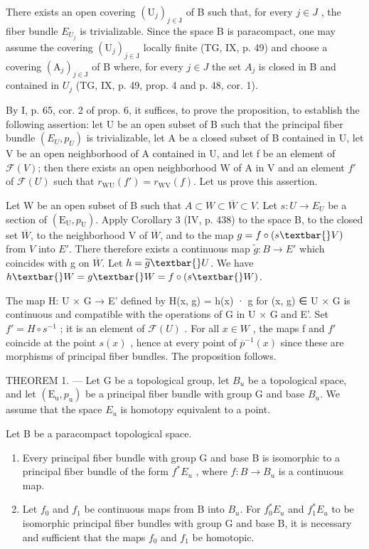 There exists an open covering \((\mathrm{U}_{j})_{j\in\mathrm{J}}\) of B such that, for every \(j\in J\) , the fiber bundle \(E_{U_{j}}\) is trivializable. Since the space B is paracompact, one may assume the covering \((\mathrm{U}_{j})_{j\in\mathrm{J}}\) locally finite (TG, IX, p. 49) and choose a covering \((\mathrm{A}_{j})_{j\in\mathrm{J}}\) of B where, for every \(j\in J\) the set \(A_{j}\) is closed in B and contained in \(U_{j}\) (TG, IX, p. 49, prop. 4 and p. 48, cor. 1).

By I, p. 65, cor. 2 of prop. 6, it suffices, to prove the proposition, to establish the following assertion: let U be an open subset of B such that the principal fiber bundle \((E_{U}, p_{U})\) is trivializable, let A be a closed subset of B contained in U, let V be an open neighborhood of A contained in U, and let f be an element of \(\mathcal{F}(V)\); then there exists an open neighborhood W of A in V and an element \(f'\) of \(\mathcal{F}(U)\) such that \(r_{\mathrm{WU}}(f') = r_{\mathrm{WV}}(f)\). Let us prove this assertion.

Let W be an open subset of B such that \(A \subset W \subset \overline{W} \subset V\). Let \(s: U \to E_{U}\) be a section of \((\mathrm{E}_{\mathrm{U}}, p_{\mathrm{U}})\). Apply Corollary 3 (IV, p. 438) to the space B, to the closed set \(\overline{W}\), to the neighborhood V of \(\overline{W}\), and to the map \(g = f \circ (s\textbar{} V)\) from \(V\) into \(E'\). There therefore exists a continuous map \(\widetilde{g}: B \to E'\) which coincides with g on \(\overline{W}\). Let \(h = \widetilde{g}\textbar{} U\). We have \(h\textbar{} W = g\textbar{} W = f \circ (s\textbar{} W)\).

The map H: U × G → E' defined by H(x, g) = h(x) · g for (x, g) ∈ U × G is continuous and compatible with the operations of G in U × G and E'. Set \(f' = H \circ s^{-1}\) ; it is an element of \(\mathcal{F}(U)\) . For all \(x \in W\) , the maps f and \(f'\) coincide at the point \(s(x)\) , hence at every point of \(\overline{p}^{-1}(x)\) since these are morphisms of principal fiber bundles. The proposition follows.

THEOREM 1. --- Let G be a topological group, let \(B_{u}\) be a topological space, and let \((\mathrm{E}_{\mathrm{u}}, p_{\mathrm{u}})\) be a principal fiber bundle with group G and base \(B_{u}\). We assume that the space \(E_{u}\) is homotopy equivalent to a point.

Let B be a paracompact topological space.

\begin{enumerate}
\def\labelenumi{\alph{enumi})}
\item
  Every principal fiber bundle with group G and base B is isomorphic to a principal fiber bundle of the form \(f^{*}E_{u}\) , where \(f: B \to B_{u}\) is a continuous map.
\item
  Let \(f_{0}\) and \(f_{1}\) be continuous maps from B into \(B_{u}\). For \(f_{0}^{*}E_{u}\) and \(f_{1}^{*}E_{u}\) to be isomorphic principal fiber bundles with group G and base B, it is necessary and sufficient that the maps \(f_{0}\) and \(f_{1}\) be homotopic.
\end{enumerate}

